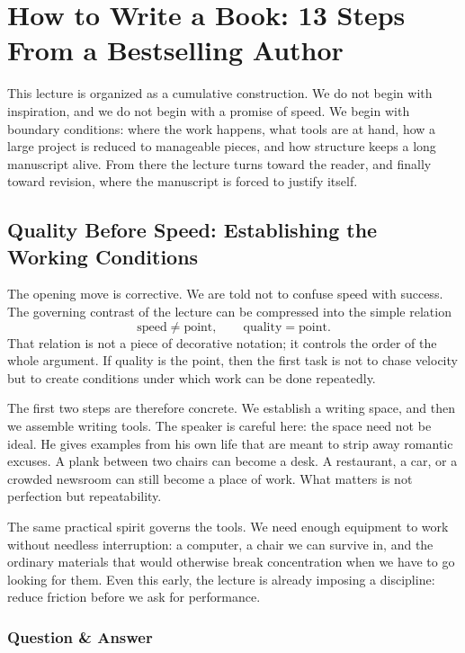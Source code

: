 \chapter{How to Write a Book: 13 Steps From a Bestselling Author}

This lecture is organized as a cumulative construction. We do not begin with inspiration, and we do not begin with a promise of speed. We begin with boundary conditions: where the work happens, what tools are at hand, how a large project is reduced to manageable pieces, and how structure keeps a long manuscript alive. From there the lecture turns toward the reader, and finally toward revision, where the manuscript is forced to justify itself.

\section{Quality Before Speed: Establishing the Working Conditions}

The opening move is corrective. We are told not to confuse speed with success. The governing contrast of the lecture can be compressed into the simple relation
\begin{equation}
\text{speed} \neq \text{point}, \qquad \text{quality} = \text{point}.
\end{equation}
That relation is not a piece of decorative notation; it controls the order of the whole argument. If quality is the point, then the first task is not to chase velocity but to create conditions under which work can be done repeatedly.

The first two steps are therefore concrete. We establish a writing space, and then we assemble writing tools. The speaker is careful here: the space need not be ideal. He gives examples from his own life that are meant to strip away romantic excuses. A plank between two chairs can become a desk. A restaurant, a car, or a crowded newsroom can still become a place of work. What matters is not perfection but repeatability.

The same practical spirit governs the tools. We need enough equipment to work without needless interruption: a computer, a chair we can survive in, and the ordinary materials that would otherwise break concentration when we have to go looking for them. Even this early, the lecture is already imposing a discipline: reduce friction before we ask for performance.

\subsection{Question \& Answer}

